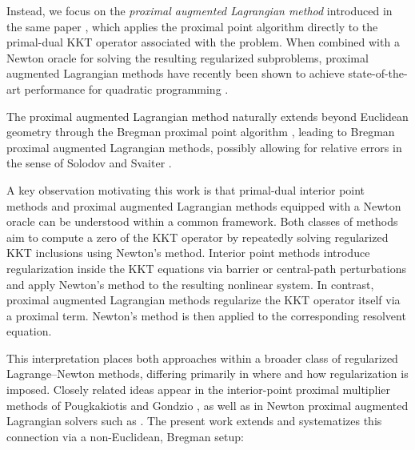 \documentclass[11pt,onecolumn]{article}
\theoremstyle{remark}
\begin{document}
Instead, we focus on the \emph{proximal augmented Lagrangian method} introduced in the same paper \cite{rockafellar1976augmented}, which applies the proximal point algorithm directly to the primal-dual KKT operator associated with the problem. 
When combined with a Newton oracle for solving the resulting regularized subproblems, proximal augmented Lagrangian methods have recently been shown to achieve state-of-the-art performance for quadratic programming \cite{hermans2019qpalm,schwan2023piqp}.

The proximal augmented Lagrangian method naturally extends beyond Euclidean geometry through the Bregman proximal point algorithm \cite{censor1992proximal,chen1993convergence,Eckstein93,eckstein1998approximate,burachik1998generalized,solodov2000inexact}, leading to Bregman proximal augmented Lagrangian methods, possibly allowing for relative errors in the sense of Solodov and Svaiter \cite{solodov2000inexact}.

A key observation motivating this work is that primal-dual interior point methods and proximal augmented Lagrangian methods equipped with a Newton oracle can be understood within a common framework.
Both classes of methods aim to compute a zero of the KKT operator by repeatedly solving regularized KKT inclusions using Newton’s method.
Interior point methods introduce regularization inside the KKT equations via barrier or central-path perturbations and apply Newton’s method to the resulting nonlinear system.
In contrast, proximal augmented Lagrangian methods regularize the KKT operator itself via a proximal term. Newton’s method is then applied to the corresponding resolvent equation.

This interpretation places both approaches within a broader class of regularized Lagrange–Newton methods, differing primarily in where and how regularization is imposed.
Closely related ideas appear in the interior-point proximal multiplier methods of Pougkakiotis and Gondzio \cite{pougkakiotis2021interior,pougkakiotis2022interior}, as well as in Newton proximal augmented Lagrangian solvers such as \cite{hermans2019qpalm}.
The present work extends and systematizes this connection via a non-Euclidean, Bregman setup:
\end{document}
